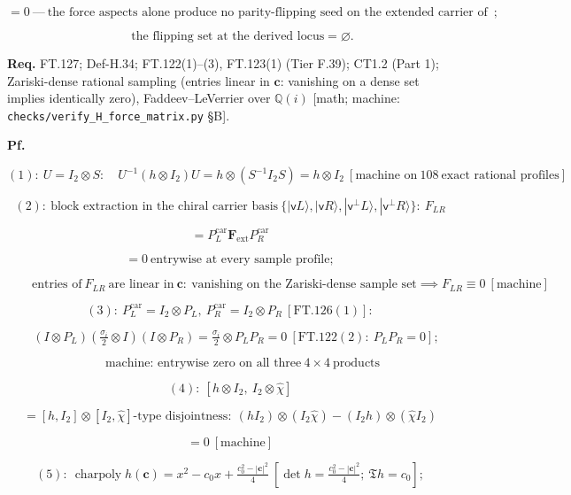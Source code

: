 \begin{theorem}
\[
= 0\ —\ \text{the force aspects alone produce no parity-flipping seed on the extended carrier of a bound chain};
\]

\[
\qquad \text{the flipping set at the derived locus}=\varnothing.
\]

\textbf{Req.} FT.127; Def-H.34; FT.122(1)–(3), FT.123(1) (Tier F.39); CT1.2 (Part 1); Zariski-dense rational sampling (entries linear in $\mathbf c$: vanishing on a dense set implies identically zero), Faddeev–LeVerrier over $\mathbb Q(i)$ [math; machine: \texttt{checks/\allowbreak{}verify\_\allowbreak{}H\_\allowbreak{}force\_\allowbreak{}matrix.py} §B].

\textbf{Pf.}

\[
(1):\ U=I_2\otimes S:\quad U^{-1}(h\otimes I_2)U=h\otimes(S^{-1}I_2S)=h\otimes I_2\ [\text{machine on}\ 108\ \text{exact rational profiles}]
\]

\[
(2):\ \text{block extraction in the chiral carrier basis}\ \{|\mathsf v L\rangle,|\mathsf v R\rangle,|\mathsf v^\perp L\rangle,|\mathsf v^\perp R\rangle\}:\ F_{LR}
\]

\[
= P_L^{\mathrm{car}}\mathbf F_{\mathrm{ext}}P_R^{\mathrm{car}}
\]

\[
= 0\ \text{entrywise at every sample profile};
\]

\[
\qquad \text{entries of}\ F_{LR}\ \text{are linear in}\ \mathbf c:\ \text{vanishing on the Zariski-dense sample set}\implies F_{LR}\equiv0\ [\text{machine}]
\]

\[
(3):\ P_L^{\mathrm{car}}=I_2\otimes P_L,\ P_R^{\mathrm{car}}=I_2\otimes P_R\ [\mathrm{FT.126}(1)]:
\]

\[
\quad (I\otimes P_L)(\tfrac{\sigma_i}2\otimes I)(I\otimes P_R)=\tfrac{\sigma_i}2\otimes P_LP_R=0\ [\mathrm{FT.122}(2):\ P_LP_R=0];
\]

\[
\qquad \text{machine: entrywise zero on all three}\ 4\times4\ \text{products}
\]

\[
(4):\ [h\otimes I_2,\ I_2\otimes\hat\chi]
\]

\[
= [h,I_2]\otimes[I_2,\hat\chi]\text{-type disjointness}:\ (hI_2)\otimes(I_2\hat\chi)-(I_2h)\otimes(\hat\chi I_2)
\]

\[
= 0\ [\text{machine}]
\]

\[
(5):\ \operatorname{charpoly}h(\mathbf c)=x^2-c_0x+\tfrac{c_0^2-|\mathbf c|^2}4\ [\det h=\tfrac{c_0^2-|\mathbf c|^2}4;\ \mathfrak T h=c_0];
\]


\end{theorem}
